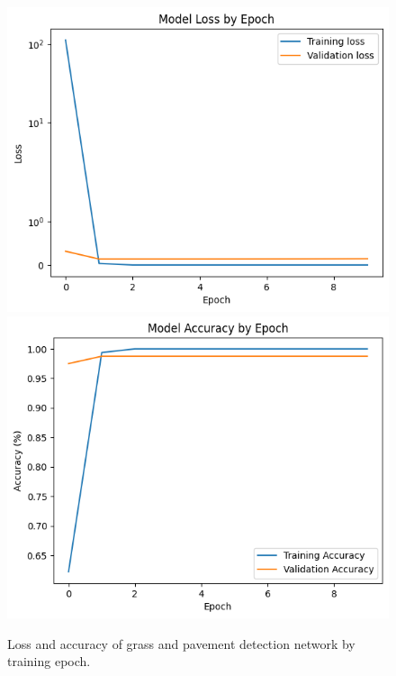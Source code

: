 \documentclass[titlepage, twocolumn]{article}
\begin{document}
            \begin{figure}
                \begin{center}
                    \includegraphics[width=\linewidth]{grasspaveloss.png}
                    \includegraphics[width=\linewidth]{grasspaveacc.png}
                \end{center}
                
                \caption{Loss and accuracy of grass and pavement detection network by training epoch.}
                \label{fig:grasspavegraphs}
            \end{figure}
\end{document}
